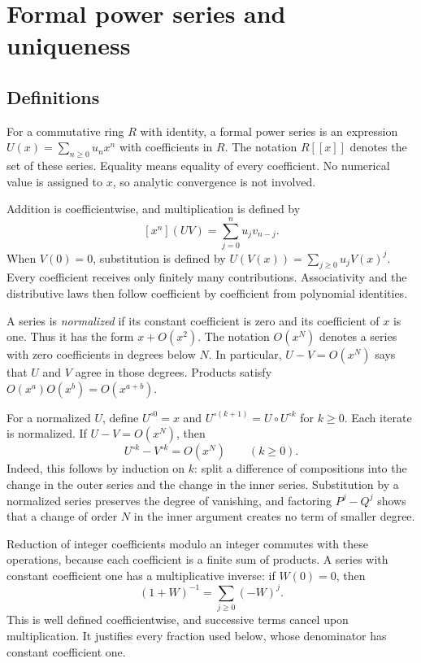 \documentclass[11pt,a4paper]{article}
\theoremstyle{remark}
\newcommand{\coeff}[2]{[x^{#1}]#2}
\begin{document}
\section{Formal power series and uniqueness}\label{sec:formal}

\subsection{Definitions}

For a commutative ring $R$ with identity, a formal power series is an
expression $U(x)=\sum_{n\ge0}u_nx^n$ with coefficients in $R$.
The notation $R[[x]]$ denotes the set of these series. Equality means
equality of every coefficient. No numerical value is assigned to $x$,
so analytic convergence is not involved.

Addition is coefficientwise, and multiplication is defined by
\[
\coeff{n}{(UV)}=\sum_{j=0}^n u_jv_{n-j}.
\]
When $V(0)=0$, substitution is defined by
$U(V(x))=\sum_{j\ge0}u_jV(x)^j$. Every coefficient receives only
finitely many contributions. Associativity and the distributive laws
then follow coefficient by coefficient from polynomial identities.

A series is \emph{normalized} if its constant coefficient is zero
and its coefficient of $x$ is one. Thus it has the form $x+O(x^2)$.
The notation $O(x^N)$ denotes a series with zero coefficients in
degrees below $N$. In particular, $U-V=O(x^N)$ says that $U$ and $V$
agree in those degrees. Products satisfy
$O(x^a)O(x^b)=O(x^{a+b})$.

For a normalized $U$, define $U^{\circ0}=x$ and
$U^{\circ(k+1)}=U\circ U^{\circ k}$ for $k\ge0$.
Each iterate is normalized. If $U-V=O(x^N)$, then
\begin{equation}\label{eq:iterate-congruence}
U^{\circ k}-V^{\circ k}=O(x^N)\qquad(k\ge0).
\end{equation}
Indeed, this follows by induction on $k$: split a difference of
compositions into the change in the outer series and the change in
the inner series. Substitution by a normalized series preserves the
degree of vanishing, and factoring $P^j-Q^j$ shows that a change of
order $N$ in the inner argument creates no term of smaller degree.

Reduction of integer coefficients modulo an integer commutes with
these operations, because each coefficient is a finite sum of
products. A series with constant coefficient one has a multiplicative
inverse: if $W(0)=0$, then
\[
(1+W)^{-1}=\sum_{j\ge0}(-W)^j.
\]
This is well defined coefficientwise, and successive terms cancel
upon multiplication. It justifies every fraction used below, whose
denominator has constant coefficient one.
\end{document}
